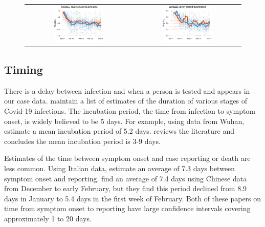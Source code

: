 \documentclass[11pt,reqno,letter]{amsart}
\theoremstyle{definition}
\begin{document}
\begin{figure}
\begin{minipage}{\linewidth}
\begin{tabular}{cc}
      \\
      \includegraphics[width=0.483\textwidth]{tables_and_figures/pnonessential-cases}
      &
        \includegraphics[width=0.483\textwidth]{tables_and_figures/pnonessential-deaths}
    \end{tabular}
  \end{minipage}
\end{figure}

\subsection{Timing\label{sec:timing}}

There is a delay between infection and when a person is tested and
appears in our case data. \cite{midas2020} maintain a list of
estimates of the duration of various stages of Covid-19
infections. The incubation period, the time from infection to symptom
onset, is widely believed to be 5 days. For example, using data from
Wuhan, \cite{li2020} estimate a mean incubation period of 5.2 days.
\cite{siorda2020} reviews the literature and concludes the mean
incubation period is 3-9 days.

Estimates of the time between symptom onset and case reporting or death
are less common. Using Italian data, \cite{cereda2020} estimate an
average of 7.3 days between symptom onset and
reporting. \cite{zhang2020} find an average of 7.4 days using Chinese data
from December to early February, but they find this period declined
from 8.9 days in January to 5.4 days in the first week of
February. Both of these papers on time from symptom onset to reporting
have large confidence intervals covering approximately 1 to 20 days.
\end{document}
